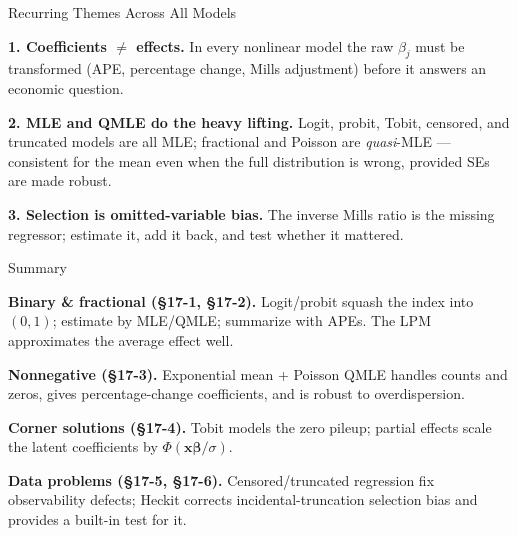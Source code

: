 \documentclass[aspectratio=169, 12pt]{beamer}
\newcommand{\xbeta}{\mathbf{x}\boldsymbol{\beta}}   %
\begin{document}
\begin{frame}{Recurring Themes Across All Models}

  \begin{highlightbox}
    \textbf{1. Coefficients $\ne$ effects.} In every nonlinear model the raw
    $\beta_j$ must be transformed (APE, percentage change, Mills adjustment) before
    it answers an economic question.
  \end{highlightbox}

  \smallskip

  \begin{highlightbox}
    \textbf{2. MLE and QMLE do the heavy lifting.} Logit, probit, Tobit, censored,
    and truncated models are all MLE; fractional and Poisson are \emph{quasi}-MLE
    --- consistent for the mean even when the full distribution is wrong, provided
    SEs are made robust.
  \end{highlightbox}

  \smallskip

  \begin{highlightbox}
    \textbf{3. Selection is omitted-variable bias.} The inverse Mills ratio is the
    missing regressor; estimate it, add it back, and test whether it mattered.
  \end{highlightbox}

\end{frame}

\begin{frame}{Summary}

  \begin{keybox}
    \textbf{Binary \& fractional (\S17-1, \S17-2).} Logit/probit squash the index
    into $(0,1)$; estimate by MLE/QMLE; summarize with APEs. The LPM approximates
    the average effect well.

    \smallskip
    \textbf{Nonnegative (\S17-3).} Exponential mean + Poisson QMLE handles counts
    and zeros, gives percentage-change coefficients, and is robust to overdispersion.

    \smallskip
    \textbf{Corner solutions (\S17-4).} Tobit models the zero pileup; partial
    effects scale the latent coefficients by $\Phi(\xbeta/\sigma)$.

    \smallskip
    \textbf{Data problems (\S17-5, \S17-6).} Censored/truncated regression fix
    observability defects; Heckit corrects incidental-truncation selection bias and
    provides a built-in test for it.
  \end{keybox}

\end{frame}
\end{document}
